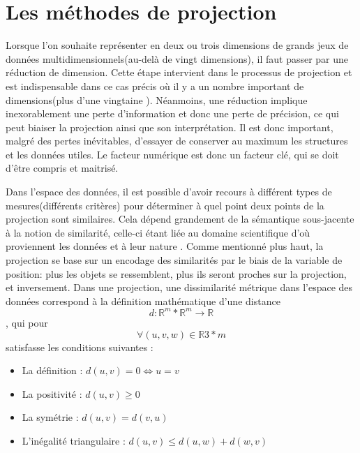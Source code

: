 \section{Les méthodes de projection}

Lorsque l'on souhaite représenter en deux ou trois dimensions de grands jeux de données multidimensionnels(au-delà de vingt dimensions\cite{dzemyda2016big}\cite{HeulotThese}), il faut passer par une réduction de dimension. 
Cette étape intervient dans le processus de projection et est indispensable dans ce cas précis où il y a un nombre important de dimensions(plus d'une vingtaine \cite{HeulotThese}). 
Néanmoins, une réduction implique inexorablement une perte d’information et donc une perte de précision, ce qui peut biaiser la projection ainsi que son interprétation. Il est donc important, malgré des pertes inévitables, d'essayer de conserver au maximum les structures et les données utiles.
Le facteur numérique est donc un facteur clé, qui se doit d’être compris et maitrisé. 
\smallskip

Dans l'espace des données, il est possible d’avoir recours à différent types de mesures(différents critères) pour déterminer à quel point deux points de la projection sont similaires. 
Cela dépend grandement de la sémantique sous-jacente à la notion de similarité, celle-ci étant liée au domaine scientifique d’où proviennent les données et à leur nature \cite{HeulotThese}.
Comme mentionné plus haut, la projection se base sur un encodage des similarités par le biais de la variable de position: plus les objets se ressemblent, plus ils seront proches sur la projection, et inversement.
Dans une projection, une dissimilarité métrique dans l’espace des données correspond à la définition mathématique d’une distance \cite{somorjai2011Dissimilarity} \cite{HeulotThese} \newline
 \[d : \mathbb{R}^{m} * \mathbb{R}^{m} \rightarrow \mathbb{R} \] \newline
, qui pour \[\forall (u,v,w) \in \mathbb{R}{3*m}\] satisfasse les conditions suivantes \cite{HeulotThese} : 
\begin{itemize}
    \item La définition : $d(u,v) = 0 \Leftrightarrow u =v$
    \item La positivité : $d(u,v)  \geq 0$
    \item La symétrie : $d(u,v) = d(v,u)$
    \item L'inégalité triangulaire : $d(u,v) \leq d(u,w) + d(w,v)$
\end{itemize}

